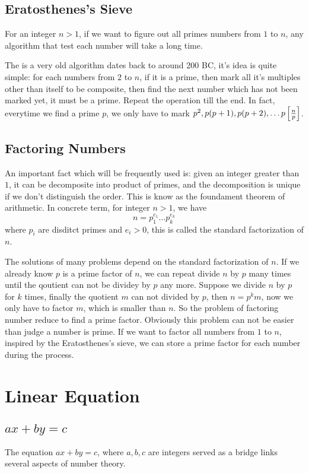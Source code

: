 \subsection{Eratosthenes's Sieve}
For an integer $n > 1$, if we want to figure out all primes numbers from $1$ to $n$,
any algorithm that test each number will take a long time.

The  is a very old algorithm dates back to around 200 BC,
it's idea is quite simple: for each numbers from $2$ to $n$, if it is a prime,
then mark all it's multiples other than itself to be composite,
then find the next number which has not been marked yet, it must be a prime.
Repeat the operation till the end. In fact, everytime we find a prime $p$,
we only have to mark $p^2, p(p + 1), p(p + 2), \dots p\left[{n \over p}\right]$.


\subsection{Factoring Numbers}
An important fact which will be frequently used is:
given an integer greater than $1$, it can be decomposite into product of primes,
and the decomposition is unique if we don't distinguish the order.
This is know as the foundament theorem of arithmetic.
In concrete term, for integer $n > 1$, we have
$$n = p_1^{e_1} \dots p_k^{e_k}$$
where $p_i$ are disditct primes and $e_i > 0$, this is called the standard factorization of $n$.

The solutions of many problems depend on the standard factorization of $n$.
If we already know $p$ is a prime factor of $n$,
we can repeat divide $n$ by $p$ many times until the qoutient can not be dividey by $p$ any more.
Suppose we divide $n$ by $p$ for $k$ times, finally the quotient $m$ can not divided by $p$,
then $n = p^k m$, now we only have to factor $m$, which is smaller than $n$.
So the problem of factoring number reduce to find a prime factor.
Obviously this problem can not be easier than judge a number is prime.
If we want to factor all numbers from $1$ to $n$, inspired by the Eratosthenes's sieve,
we can store a prime factor for each number during the process.


\section{Linear Equation}
\subsection{$ax + by = c$}
The equation $ax + by = c$, where $a, b, c$ are integers served as a bridge links several aspects of number theory.

